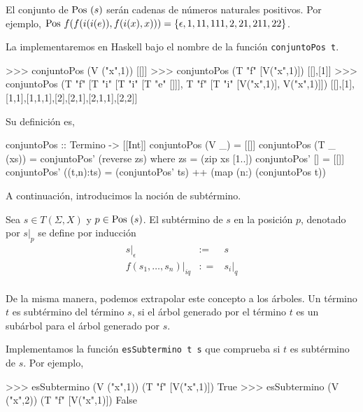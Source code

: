 El conjunto de $\mbox{Pos }(s)$ serán cadenas de números naturales
positivos. Por ejemplo,
$\mbox{Pos } f(f(i(i(e)),f(i(x),x))) = \{ \epsilon,1,11,111,2,21,211,22 \}$.

La implementaremos en Haskell bajo el nombre de la función \texttt{conjuntoPos t}.

\begin{sesion}
>>> conjuntoPos (V ("x",1))
[[]]
>>> conjuntoPos (T "f" [V("x",1)])
[[],[1]]
>>> conjuntoPos (T "f" [T "i" [T "i" [T "e" []]],
                   T "f" [T "i" [V("x",1)], V("x",1)]])
[[],[1],[1,1],[1,1,1],[2],[2,1],[2,1,1],[2,2]]
\end{sesion}

Su definición es,

\begin{codigo}
conjuntoPos :: Termino -> [[Int]]
conjuntoPos (V _) = [[]]
conjuntoPos (T _ (xs)) = conjuntoPos' (reverse zs)
    where zs = (zip xs [1..])
          conjuntoPos' [] = [[]]
          conjuntoPos' ((t,n):ts) = (conjuntoPos' ts) ++ 
                                    (map (n:) (conjuntoPos t))
\end{codigo}


A continuación, introducimos la noción de subtérmino.
\begin{defi}
  Sea $s \in T(\Sigma, X)$ y $p \in \mbox{Pos } (s)$. El subtérmino de $s$ en
  la posición $p$, denotado por $s|_p$ se define por inducción
  \begin{equation*}
    \begin{array}{rcl}
      s|_\epsilon & :=  & s \\
      f(s_1,\dots,s_n)|_{iq} & : = & s_i|_q \\
    \end{array}
  \end{equation*}
\end{defi}

De la misma manera, podemos extrapolar este concepto a los árboles. Un
término $t$ es subtérmino del término $s$, si el árbol generado por el
término $t$ es un subárbol para el árbol generado por $s$. 

Implementamos la función \texttt{esSubtermino t s} que comprueba si $t$ es
subtérmino de $s$. Por ejemplo,

\begin{sesion}
>>> esSubtermino (V ("x",1)) (T "f" [V("x",1)])
True
>>> esSubtermino (V ("x",2)) (T "f" [V("x",1)])
False
\end{sesion}


